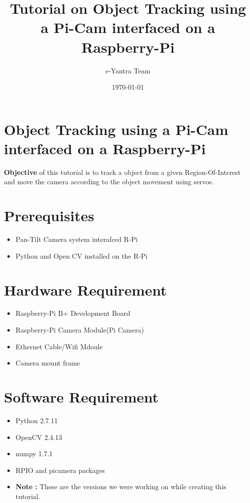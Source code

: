 \documentclass[11pt,a4paper]{article}
\title{Tutorial on Object  Tracking using a Pi-Cam interfaced on a Raspberry-Pi}
\author{e-Yantra Team}
\date{\today}
\begin{document}
	\maketitle
	\newpage
	\tableofcontents
	\newpage
	\section{Object  Tracking using a Pi-Cam interfaced on a Raspberry-Pi}
	\textbf{Objective} of this tutorial is to track a object from a given Region-Of-Interest and move the camera according to the object movement using servos.
	\section{Prerequisites}
	\begin{itemize}
		\item Pan-Tilt Camera system interafced R-Pi
		\item Python and Open CV installed on the R-Pi
	\end{itemize}
	\section{Hardware Requirement}
	\begin{itemize}
		\item Raspberry-Pi B+ Development Board
		\item Raspberry-Pi Camera Module(Pi Camera)
		\item Ethernet Cable/Wifi Mdoule
		\item Camera mount frame
	\end{itemize}
	\section{Software Requirement}
	\begin{itemize}
		\item Python 2.7.11
		\item OpenCV 2.4.13 
		\item numpy 1.7.1
		\item RPIO and picamera packages
        \item \textbf{Note :} These are the versions we were working on while creating this tutorial.
	\end{itemize}
\end{document}

